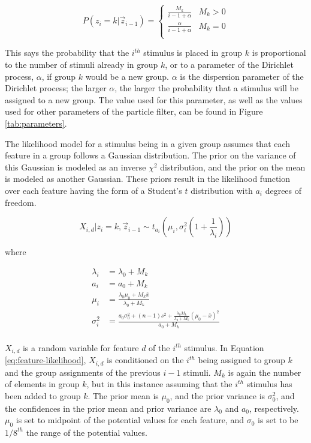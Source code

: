 \begin{equation}
P(z_i = k | \vec{z}_{i-1}) = 
\begin{cases}
  \frac{M_k}{i - 1 + \alpha} & M_k > 0 \\
  \frac{\alpha}{i - 1 + \alpha} & M_k = 0 \\
\end{cases}
\end{equation}

This says the probability that the $i^{th}$ stimulus is placed in group $k$ is
proportional to the number of stimuli already in group $k$, or to a parameter of
the Dirichlet process, $\alpha$, if group $k$ would be a new group.  $\alpha$ is the dispersion parameter of the Dirichlet
process; the larger $\alpha$, the larger the probability that a stimulus will be
assigned to a new group. The value used for this parameter, as well as the
values used for other parameters of the particle filter, can be found in Figure
\ref{tab:parameters}. 

The likelihood model for a stimulus being in a given group assumes that each
feature in a group follows a Gaussian distribution. The prior on the variance of
this Gaussian is modeled as an inverse $\chi^2$ distribution, and the prior on
the mean is modeled as another Gaussian. These priors result in the
likelihood function over each feature having the form of a Student's $t$
distribution with $a_i$ degrees of freedom. 

\begin{equation}
X_{i,d} | z_i = k,  \vec{z}_{i-1} \sim
t_{a_i}\left(\mu_i, \sigma_i^2 \left(1 + \frac{1}{\lambda_i}\right) \right)
\label{eq:feature-likelihood}
\end{equation}

where

\begin{align}
  \lambda_i &= \lambda_0 + M_k \\
  a_i &= a_0 + M_k \\
  \mu_i &= \frac{\lambda_0 \mu_0 + M_k \bar{x}}{\lambda_0 + M_k} \\
  \sigma_i^2 &= \frac{a_0 \sigma_0^2 + (n - 1) s^2 + \frac{\lambda_0
      M_k}{\lambda_0 + M_k} (\mu_0 - \bar{x})^2}{a_0 + M_k}\\
\end{align}

$X_{i,d}$ is a random variable for feature $d$ of the $i^{th}$ stimulus. In
Equation \ref{eq:feature-likelihood}, $X_{i,d}$ is conditioned on the $i^{th}$
being assigned to group $k$ and the group assignments of the previous $i-1$
stimuli. $M_k$ is again the number of elements in group $k$, but in this
instance assuming that the $i^{th}$ stimulus has been added to group $k$. The
prior mean is $\mu_0$, and the prior variance is $\sigma_0^2$, and the
confidences in the prior mean and prior variance are $\lambda_0$ and $a_0$,
respectively. $\mu_0$ is set to midpoint of the potential values for each feature,
and $\sigma_0$ is set to be $1/8^{th}$ the range of the potential values.

